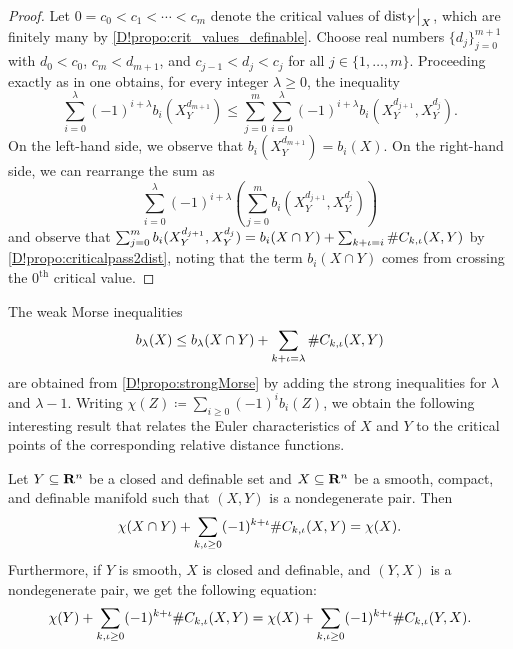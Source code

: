 \begin{proof}
\label{D!prop:Sardproperty}
  Let $0=c_0 < c_1 < \cdots < c_m$ denote the critical values of $\mathord{\operatorname{dist}}_Y\big|_X$, which are finitely many by \cref{D!propo:crit_values_definable}. Choose real numbers $\{d_j\}_{j=0}^{m+1}$ with $d_0<c_0$, $c_m < d_{m+1}$, and $c_{j-1} < d_j < c_j$ for all $j\in \{1,\ldots ,m\}$. Proceeding exactly as in \cite[Sect.~5]{Milnor1963} one obtains, for every integer $\lambda \ge 0$, the inequality
  \[
    \sum_{i=0}^{\lambda} (-1)^{i+\lambda} b_i (X_Y^{d_{m+1}}) \le \sum_{j=0}^{m} \sum_{i=0}^{\lambda} (-1)^{i+\lambda} b_i (X_Y^{d_{j+1}},X_Y^{d_{j}}).
  \]
  On the left-hand side, we observe that $b_i (X_Y^{d_{m+1}})=b_i (X)$.
  On the right-hand side, we can rearrange the sum as 
  \[
    \sum_{i=0}^{\lambda} (-1)^{i+\lambda} \left( \sum_{j=0}^{m}  b_i (X_Y^{d_{j+1}},X_Y^{d_{j}}) \right)
  \]
  and observe that $\sum_{j=0}^{m}  b_i (X_Y^{d_{j+1}},X_Y^{d_{j}}) = b_i (X\cap Y) + \sum_{k+\iota=i} \# C_{k,\iota}(X,Y)$ by \cref{D!propo:criticalpass2dist}, noting that the term $b_i (X\cap Y)$ comes from crossing the $0^{\text{th}}$ critical value. 
\end{proof}

The weak Morse inequalities
\[
  b_{\lambda} (X) \le b_{\lambda} (X \cap Y) + \sum_{k + \iota = \lambda} \# C_{k, \iota}(X,Y)
\]
are obtained from \cref{D!propo:strongMorse} by adding the strong inequalities for $\lambda$ and $\lambda -1$.
Writing $\chi(Z) \coloneq \sum_{i\ge 0} (-1)^i b_i (Z)$, we obtain the following interesting result that relates the Euler characteristics of $X$ and $Y$ to the critical points of the corresponding relative distance functions.

\begin{corollary}
\label{D!coro:duality}
  Let $Y\subseteq \mathbf{R}^n$ be a closed and definable set and $X\subseteq \mathbf{R}^n$ be a smooth, compact, and definable manifold such that $(X, Y)$ is a nondegenerate pair. Then
  \[
    \chi(X\cap Y)+\sum_{k, \iota \geq 0}(-1)^{k + \iota}\#C_{k, \iota}(X, Y)=\chi(X).
  \]
  Furthermore, if $Y$ is smooth, $X$ is closed and definable, and $(Y,X)$ is a nondegenerate pair, we get the following equation:
  \begin{equation}
  \label{D!E:chi}
    \chi(Y)+\sum_{k, \iota\geq 0}(-1)^{k + \iota}\#C_{k, \iota}(X, Y)=\chi(X)+\sum_{k, \iota\geq 0}(-1)^{k + \iota}\#C_{k, \iota}(Y, X).
  \end{equation}
\end{corollary}

